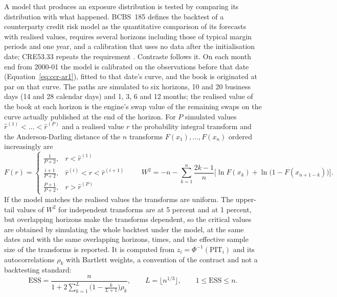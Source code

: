 A model that produces an exposure distribution is tested by comparing its distribution with what happened. BCBS~185 defines the backtest of a counterparty credit risk model as the quantitative comparison of its forecasts with realised values, requires several horizons including those of typical margin periods and one year, and a calibration that uses no data after the initialisation date; CRE53.33 repeats the
requirement \citep{ccr:bcbs185,ccr:cre53}. Contraste follows it. On each month end from 2000-01 the model is calibrated on the observations before that date (Equation~\ref{eq:ccr-ar1}), fitted to that date's curve, and the book is originated at par on that curve. The paths are simulated to six horizons, 10 and 20 business days (14 and 28 calendar days) and
1, 3, 6 and 12 months; the realised value of the book at each horizon is the engine's swap value of the remaining swaps on the curve actually published at the end of the horizon. For $P$ simulated values $\hat r^{(1)}<\dots<\hat r^{(P)}$ and a realised value $r$ the probability integral transform and the Anderson-Darling distance of the $n$ transforms
$F(x_1),\dots,F(x_n)$ ordered increasingly are \citep{ccr:formenti2015}
\begin{equation}
F(r)=\begin{cases}\frac{1}{P+2},&r<\hat r^{(1)}\\[2pt]\frac{i+1}{P+2},&\hat r^{(i)}<r<\hat r^{(i+1)}\\[2pt]\frac{P+1}{P+2},&r>\hat r^{(P)}\end{cases}\qquad
W^2=-n-\sum_{k=1}^{n}\frac{2k-1}{n}\Big[\ln F(x_k)+\ln\big(1-F(x_{n+1-k})\big)\Big].
\label{eq:ccr-pit}
\end{equation}
If the model matches the realised values the transforms are uniform. The upper-tail values of $W^2$ for independent transforms are \ccrIidFive{} at 5 percent and \ccrIidOne{} at 1 percent, but overlapping horizons make the transforms dependent, so the critical values are obtained by simulating the whole backtest under the model, at the same dates and with the same overlapping horizons,
\ccrCriticalCount{} times, and the effective sample size of the transforms is reported. It is computed from $z_i=\Phi^{-1}(\mathrm{PIT}_i)$ and its autocorrelations $\rho_k$ with Bartlett weights, a convention of the contract and not a backtesting standard:
\begin{equation}
\mathrm{ESS}=\frac{n}{1+2\sum_{k=1}^{L}\big(1-\frac{k}{L+1}\big)\rho_k},\qquad L=\lfloor n^{1/3}\rfloor,\qquad 1\le\mathrm{ESS}\le n.
\label{eq:ccr-ess}
\end{equation}
